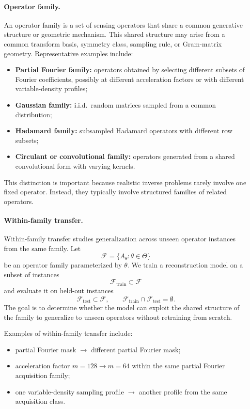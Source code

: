 \documentclass[11pt]{article}
\begin{document}
\paragraph{Operator family.}
An operator family is a set of sensing operators that share a common generative structure or geometric mechanism. This shared structure may arise from a common transform basis, symmetry class, sampling rule, or Gram-matrix geometry. Representative examples include:
\begin{itemize}
    \item \textbf{Partial Fourier family:} operators obtained by selecting different subsets of Fourier coefficients, possibly at different acceleration factors or with different variable-density profiles;
    \item \textbf{Gaussian family:} i.i.d.\ random matrices sampled from a common distribution;
    \item \textbf{Hadamard family:} subsampled Hadamard operators with different row subsets;
    \item \textbf{Circulant or convolutional family:} operators generated from a shared convolutional form with varying kernels.
\end{itemize}

This distinction is important because realistic inverse problems rarely involve one fixed operator. Instead, they typically involve structured families of related operators.

\paragraph{Within-family transfer.}
Within-family transfer studies generalization across unseen operator instances from the same family. Let
\[
\mathcal{F} = \{A_\theta : \theta \in \Theta\}
\]
be an operator family parameterized by \(\theta\). We train a reconstruction model on a subset of instances
\[
\mathcal{F}_{\mathrm{train}} \subset \mathcal{F}
\]
and evaluate it on held-out instances
\[
\mathcal{F}_{\mathrm{test}} \subset \mathcal{F}, \qquad
\mathcal{F}_{\mathrm{train}} \cap \mathcal{F}_{\mathrm{test}} = \emptyset.
\]
The goal is to determine whether the model can exploit the shared structure of the family to generalize to unseen operators without retraining from scratch.

Examples of within-family transfer include:
\begin{itemize}
    \item partial Fourier mask \(\rightarrow\) different partial Fourier mask;
    \item acceleration factor \(m=128 \rightarrow m=64\) within the same partial Fourier acquisition family;
    \item one variable-density sampling profile \(\rightarrow\) another profile from the same acquisition class.
\end{itemize}
\end{document}
